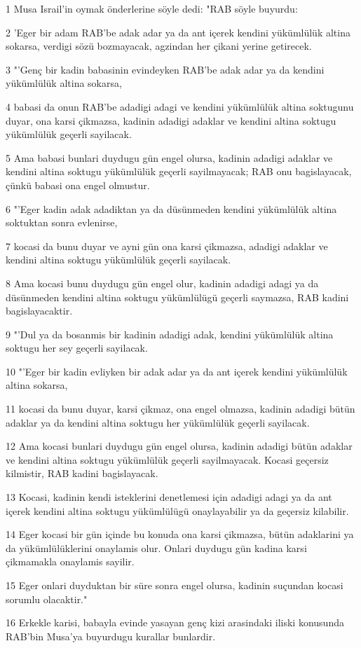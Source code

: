 \par 1 Musa Israil'in oymak önderlerine söyle dedi: "RAB söyle buyurdu:
\par 2 'Eger bir adam RAB'be adak adar ya da ant içerek kendini yükümlülük altina sokarsa, verdigi sözü bozmayacak, agzindan her çikani yerine getirecek.
\par 3 "'Genç bir kadin babasinin evindeyken RAB'be adak adar ya da kendini yükümlülük altina sokarsa,
\par 4 babasi da onun RAB'be adadigi adagi ve kendini yükümlülük altina soktugunu duyar, ona karsi çikmazsa, kadinin adadigi adaklar ve kendini altina soktugu yükümlülük geçerli sayilacak.
\par 5 Ama babasi bunlari duydugu gün engel olursa, kadinin adadigi adaklar ve kendini altina soktugu yükümlülük geçerli sayilmayacak; RAB onu bagislayacak, çünkü babasi ona engel olmustur.
\par 6 "'Eger kadin adak adadiktan ya da düsünmeden kendini yükümlülük altina soktuktan sonra evlenirse,
\par 7 kocasi da bunu duyar ve ayni gün ona karsi çikmazsa, adadigi adaklar ve kendini altina soktugu yükümlülük geçerli sayilacak.
\par 8 Ama kocasi bunu duydugu gün engel olur, kadinin adadigi adagi ya da düsünmeden kendini altina soktugu yükümlülügü geçerli saymazsa, RAB kadini bagislayacaktir.
\par 9 "'Dul ya da bosanmis bir kadinin adadigi adak, kendini yükümlülük altina soktugu her sey geçerli sayilacak.
\par 10 "'Eger bir kadin evliyken bir adak adar ya da ant içerek kendini yükümlülük altina sokarsa,
\par 11 kocasi da bunu duyar, karsi çikmaz, ona engel olmazsa, kadinin adadigi bütün adaklar ya da kendini altina soktugu her yükümlülük geçerli sayilacak.
\par 12 Ama kocasi bunlari duydugu gün engel olursa, kadinin adadigi bütün adaklar ve kendini altina soktugu yükümlülük geçerli sayilmayacak. Kocasi geçersiz kilmistir, RAB kadini bagislayacak.
\par 13 Kocasi, kadinin kendi isteklerini denetlemesi için adadigi adagi ya da ant içerek kendini altina soktugu yükümlülügü onaylayabilir ya da geçersiz kilabilir.
\par 14 Eger kocasi bir gün içinde bu konuda ona karsi çikmazsa, bütün adaklarini ya da yükümlülüklerini onaylamis olur. Onlari duydugu gün kadina karsi çikmamakla onaylamis sayilir.
\par 15 Eger onlari duyduktan bir süre sonra engel olursa, kadinin suçundan kocasi sorumlu olacaktir."
\par 16 Erkekle karisi, babayla evinde yasayan genç kizi arasindaki iliski konusunda RAB'bin Musa'ya buyurdugu kurallar bunlardir.

